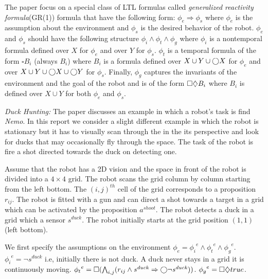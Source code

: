 The paper focus on a special class of LTL formulas called \emph{generalized reactivity formula}(GR(1)) formula
that have the following form: $\phi_e \Rightarrow \phi_s$  where $\phi_e$ is the assumption
about the environment and $\phi_s$ is the desired behavior of the robot.
$\phi_e$ and $\phi_s$ should have the following structure $\phi_i \wedge \phi_t \wedge \phi_g$ where
$\phi_i$ is a nontemporal formula defined over $X$ for $\phi_e$ and over $Y$ for $\phi_s$. 
$\phi_t$ is a temporal formula of the form $\square B_i$ (always $B_i$) where $B_i$ is a formula 
defined over $X \cup Y \cup \bigcirc X$ for $\phi_e$ and over $X \cup Y \cup \bigcirc X \cup \bigcirc Y$ for
$\phi_s$. Finally, $\phi_g$ captures the invariants of the environment and the goal of the robot 
and is of the form $\square \diamondsuit B_i$
where $B_i$ is defined over $X \cup Y$ for both $\phi_e$ and $\phi_s$.

\newcommand{\shoot}{\mathit{a^{shoot}}}
\newcommand{\duck}{\mathit{s^{duck}}}

\textit{Duck Hunting:} The paper discusses an example in which a robot's task is find \emph{Nemo}.
In this report we consider a slight different example in which the robot is stationary but
it has to visually scan through the in the its perspective and look for ducks that may occasionally 
fly through the space. The task of the robot is fire a shot directed towards the duck on detecting one.

Assume that the robot has a 2D vision and the space in front of the robot is divided into a $4 \times 4$ grid.
The robot scans the grid column by column starting from the left bottom. 
The $(i,j)^{th}$ cell of the grid corresponds to a proposition $r_{ij}$.
The robot is fitted with a gun and can direct a shot towards a target in a grid which can be activated 
by the proposition $\shoot$. The robot detects a duck in a grid which a sensor $\duck$.
The robot initially starts at the grid position $(1,1)$ (left bottom).

We first specify the assumptions on the environment $\phi_e = {\phi_i}^e \wedge {\phi_t}^e \wedge {\phi_g}^e$.
${\phi_i}^e = \neg \duck$ i.e, initially there is not duck. 
A duck never stays in a grid it is continuously moving.
${\phi_t}^e = \always ( \bigwedge_{i,j} (r_{ij} \wedge \duck \Rightarrow \next \neg \duck))$.
${\phi_g}^e = \square \diamondsuit true$.

